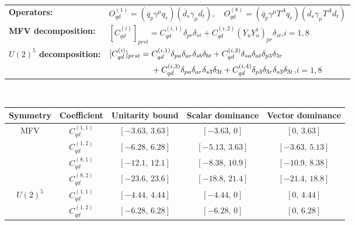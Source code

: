\begin{table}[htbp]
\centering
{\small
\begin{tabular}{ll}
    \textbf{Operators:} &
        $\boxed{O_{qd}^{(1)} = (\overline q_p \gamma^\mu q_r)(\overline d_s \gamma_\mu d_t),\quad O_{qd}^{(8)} = (\overline q_p \gamma^\mu T^A q_r)(\overline d_s \gamma_\mu T^A d_t)}$ \\[0.2cm]
    \textbf{MFV decomposition:} &
        $[C_{qd}^{(i)}]_{prst} =
            C_{qd}^{(i,1)}\delta_{pr}\delta_{st}
            + C_{qd}^{(i,2)}(Y_u Y_u^\dagger)_{pr}\delta_{st}$,\quad $i=1,8$ \\[0.15cm]
    \textbf{$U(2)^5$ decomposition:} &
        $[C_{qd}^{(i)}]_{prst} =
            C_{qd}^{(i,1)}\Pij{p}{r}{a}\Pij{s}{t}{b}
            + C_{qd}^{(i,2)}\Pij{s}{t}{a}\delta_{p3}\delta_{3r}$ \\
        & $\phantom{[C_{qd}^{(i)}]_{prst} ={}}+ C_{qd}^{(i,3)}\Pij{p}{r}{a}\delta_{s3}\delta_{3t}
            + C_{qd}^{(i,4)}\delta_{p3}\delta_{3r}\delta_{s3}\delta_{3t}$,\quad $i=1,8$ \\
\end{tabular}
\\[0.3cm]
\renewcommand{\arraystretch}{1.3}
\begin{tabular}{ccccc}
    \toprule
    \rowcolor{hdrcolor}
    \textbf{Symmetry} & \textbf{Coefficient}
        & \textbf{Unitarity bound}
        & \textbf{Scalar dominance}
        & \textbf{Vector dominance} \\
    \midrule
    \multirow{4}{*}{MFV}
        & $C_{qd}^{(1,1)}$ & $[-3.63,\, 3.63]$ & $[-3.63,\, 0]$     & $[0,\, 3.63]$     \\
        & $C_{qd}^{(1,2)}$ & $[-6.28,\, 6.28]$ & $[-5.13,\, 3.63]$  & $[-3.63,\, 5.13]$ \\
        & $C_{qd}^{(8,1)}$ & $[-12.1,\, 12.1]$ & $[-8.38,\, 10.9]$  & $[-10.9,\, 8.38]$ \\
        & $C_{qd}^{(8,2)}$ & $[-23.6,\, 23.6]$ & $[-18.8,\, 21.4]$  & $[-21.4,\, 18.8]$ \\
    \midrule
    \multirow{8}{*}{$U(2)^5$}
        & $C_{qd}^{(1,1)}$ & $[-4.44,\, 4.44]$ & $[-4.44,\, 0]$    & $[0,\, 4.44]$    \\
        & $C_{qd}^{(1,2)}$ & $[-6.28,\, 6.28]$ & $[-6.28,\, 0]$    & $[0,\, 6.28]$    \\

\end{tabular}}
\end{table}
